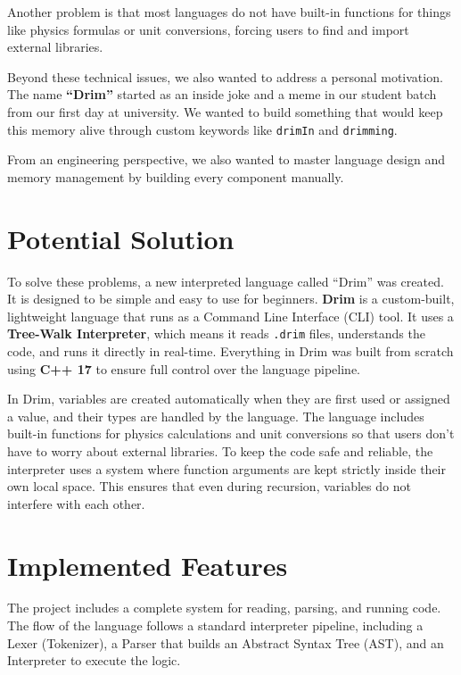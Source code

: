 \documentclass[12pt, a4paper]{article}
\begin{document}
\vspace{0.4cm}

Another problem is that most languages do not have built-in functions for things like physics formulas or unit conversions, forcing users to find and import external libraries. 

\vspace{0.4cm}

Beyond these technical issues, we also wanted to address a personal motivation. The name \textbf{“Drim”} started as an inside joke and a meme in our student batch from our first day at university. We wanted to build something that would keep this memory alive through custom keywords like \texttt{drimIn} and \texttt{drimming}. 

\vspace{0.4cm}

From an engineering perspective, we also wanted to master language design and memory management by building every component manually.

\vspace{1cm}

\section{Potential Solution}
To solve these problems, a new interpreted language called ``Drim'' was created. It is designed to be simple and easy to use for beginners. \textbf{Drim} is a custom-built, lightweight language that runs as a Command Line Interface (CLI) tool. It uses a \textbf{Tree-Walk Interpreter}, which means it reads \texttt{.drim} files, understands the code, and runs it directly in real-time. Everything in Drim was built from scratch using \textbf{C++ 17} to ensure full control over the language pipeline.

\vspace{0.4cm}

In Drim, variables are created automatically when they are first used or assigned a value, and their types are handled by the language. The language includes built-in functions for physics calculations and unit conversions so that users don't have to worry about external libraries. To keep the code safe and reliable, the interpreter uses a system where function arguments are kept strictly inside their own local space. This ensures that even during recursion, variables do not interfere with each other.

\newpage

\section{Implemented Features}
The project includes a complete system for reading, parsing, and running code. The flow of the language follows a standard interpreter pipeline, including a Lexer (Tokenizer), a Parser that builds an Abstract Syntax Tree (AST), and an Interpreter to execute the logic.
\end{document}
